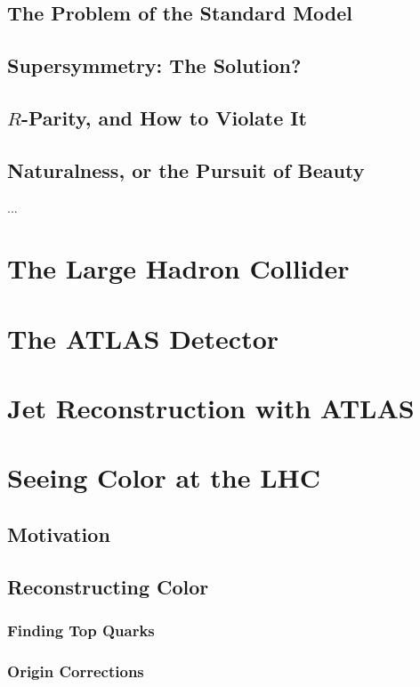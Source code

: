 \documentclass{report}
\begin{document}
\section{The Problem of the Standard Model}
\section{Supersymmetry: The Solution?}
\section{$R$-Parity, and How to Violate It}
\section{Naturalness, or the Pursuit of Beauty}
		 ...


\chapter{The Large Hadron Collider}

		

\chapter{The ATLAS Detector}



\chapter{Jet Reconstruction with ATLAS}


\chapter{Seeing Color at the LHC}
\section{Motivation}
\section{Reconstructing Color}
	\subsection{Finding Top Quarks}
	\subsection{Origin Corrections}
\end{document}
